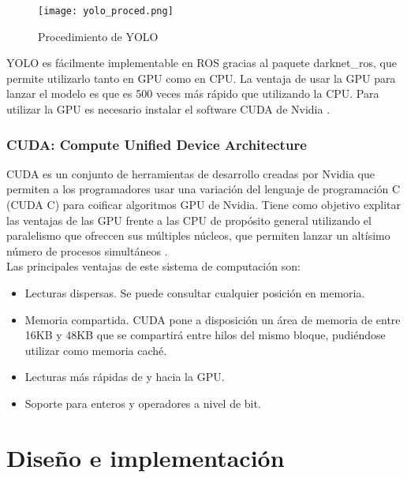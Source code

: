 \begin{figure}[h]
	\begin{center} 
		\texttt{[image: yolo\_proced.png]}
	\end{center}
	\caption{Procedimiento de YOLO}
	\label{fig:proced}
\end{figure}

YOLO es fácilmente implementable en ROS gracias al paquete darknet\_ros, que permite utilizarlo tanto en GPU como en CPU. La ventaja de usar la GPU para lanzar el modelo es que es 500 veces más rápido que utilizando la CPU. Para utilizar la GPU es necesario instalar el software CUDA de Nvidia \cite{yolo}.\\

\subsection{CUDA: Compute Unified Device Architecture}

CUDA es un conjunto de herramientas de desarrollo creadas por Nvidia que permiten a los programadores usar una variación del lenguaje de programación C (CUDA C) para coificar algoritmos GPU de Nvidia. Tiene como objetivo explitar las ventajas de las GPU frente a las CPU de propósito general utilizando el paralelismo que ofreccen sus múltiples núcleos, que permiten lanzar un altísimo número de procesos simultáneos \cite{cuda}.\\

Las principales ventajas de este sistema de computación son:

\begin{itemize}

	\item Lecturas dispersas. Se puede consultar cualquier posición en memoria.
	\item Memoria compartida. CUDA pone a disposición un área de memoria de entre 16KB y 48KB que se compartirá entre hilos del mismo bloque, pudiéndose utilizar como memoria caché.
	\item Lecturas más rápidas de y hacia la GPU.
	\item Soporte para enteros y operadores a nivel de bit.

\end{itemize}



\chapter{Diseño e implementación}

